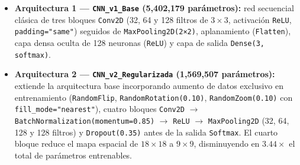 \begin{itemize}
    \item \textbf{Arquitectura 1 — \texttt{CNN\_v1\_Base} (5,402,179 parámetros):} red secuencial clásica de tres bloques \texttt{Conv2D} (32, 64 y 128 filtros de $3 \times 3$, activación \texttt{ReLU}, \texttt{padding="same"}) seguidos de \texttt{MaxPooling2D(2×2)}, aplanamiento (\texttt{Flatten}), capa densa oculta de 128 neuronas (\texttt{ReLU}) y capa de salida \texttt{Dense(3, softmax)}.
    \item \textbf{Arquitectura 2 — \texttt{CNN\_v2\_Regularizada} (1,569,507 parámetros):} extiende la arquitectura base incorporando aumento de datos exclusivo en entrenamiento (\texttt{RandomFlip}, \texttt{RandomRotation(0.10)}, \texttt{RandomZoom(0.10)} con \texttt{fill\_mode="nearest"}), cuatro bloques \texttt{Conv2D} $\to$ \texttt{BatchNormalization(momentum=0.85)} $\to$ \texttt{ReLU} $\to$ \texttt{MaxPooling2D} (32, 64, 128 y 128 filtros) y \texttt{Dropout(0.35)} antes de la salida \texttt{Softmax}. El cuarto bloque reduce el mapa espacial de $18 \times 18$ a $9 \times 9$, disminuyendo en $3.44\times$ el total de parámetros entrenables.
\end{itemize}

